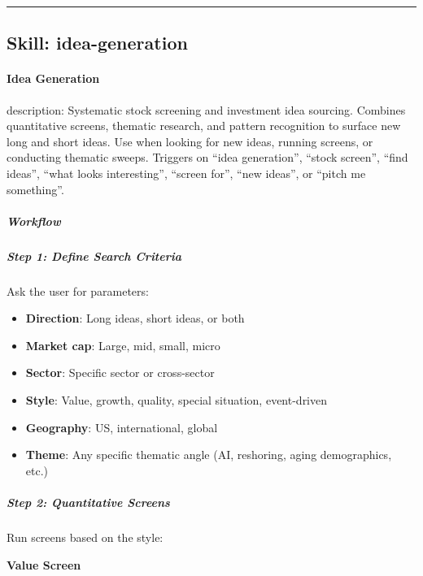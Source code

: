 \documentclass[11pt]{article}
\begin{document}
\vspace{0.8em}\hrule\vspace{0.8em}

\subsection{Skill: idea-generation}\label{file:skills-idea-generation-SKILL-md}

\paragraph{Idea Generation}\mbox{}\par

description: Systematic stock screening and investment idea sourcing. Combines quantitative screens, thematic research, and pattern recognition to surface new long and short ideas. Use when looking for new ideas, running screens, or conducting thematic sweeps. Triggers on ``idea generation'', ``stock screen'', ``find ideas'', ``what looks interesting'', ``screen for'', ``new ideas'', or ``pitch me something''.


\subparagraph{Workflow}\mbox{}\par

\subparagraph{Step 1: Define Search Criteria}\mbox{}\par

Ask the user for parameters:

\begin{itemize}[leftmargin=*,itemsep=2pt,topsep=2pt]
\item {} \textbf{Direction}: Long ideas, short ideas, or both
\item {} \textbf{Market cap}: Large, mid, small, micro
\item {} \textbf{Sector}: Specific sector or cross-sector
\item {} \textbf{Style}: Value, growth, quality, special situation, event-driven
\item {} \textbf{Geography}: US, international, global
\item {} \textbf{Theme}: Any specific thematic angle (AI, reshoring, aging demographics, etc.)
\end{itemize}

\subparagraph{Step 2: Quantitative Screens}\mbox{}\par

Run screens based on the style:


\textbf{Value Screen}
\end{document}
